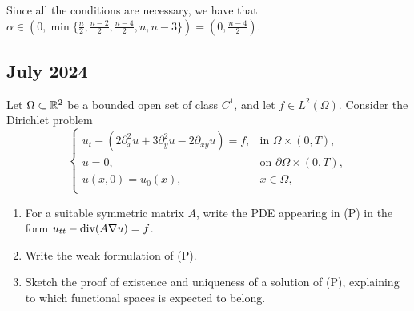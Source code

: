 Since all the conditions are necessary, we have that \(\alpha \in (0, \min\{\frac{n}{2}, \frac{n - 2}{2}, \frac{n - 4}{2}, n, n - 3\}) = (0, \frac{n - 4}{2})\).

\newpage
\subsection{July 2024}
\begin{exercise}
    Let \(\Omega \subset \mathbb{R}^2\) be a bounded open set of class \(C^1\), and let \(f \in L^2(\Omega)\). Consider the Dirichlet problem
    \begin{equation*}
        \begin{cases}
            u_{t} - \left(2\partial_x^2 u +  3\partial_y^2 u - 2 \partial_{xy} u\right) = f, & \text{in } \Omega \times (0, T), \\
            u = 0, & \text{on } \partial \Omega \times (0, T), \\
            u(x,0) = u_0(x), & x \in \Omega, \\
        \end{cases}
        \tag{(P)}
    \end{equation*}
    \begin{enumerate}
        \item For a suitable symmetric matrix \(A\), write the PDE appearing in (P) in the form \(u_{tt} - \text{div}(A \nabla u) = f\).
        \item Write the weak formulation of (P).
        \item Sketch the proof of existence and uniqueness of a solution of (P), explaining to which functional spaces is expected to belong.
    \end{enumerate}
\end{exercise}
